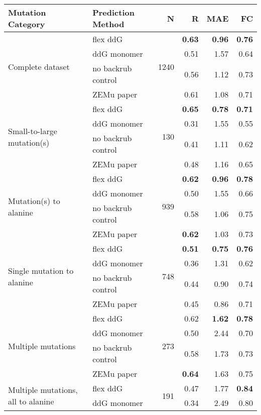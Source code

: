 \begin{table}
  \begin{tabular}{llrrrr}
\toprule
Mutation Category &   Prediction Method &     N &    R &  MAE &   FC \\
\midrule
 \multirow{ 4}{*}{Complete dataset} & flex ddG & \multirow{ 4}{*}{1240} & \textbf{0.63} & \textbf{0.96} & \textbf{0.76}  \\
 & ddG monomer & & 0.51 & 1.57 & 0.64  \\
 & no backrub control & & 0.56 & 1.12 & 0.73  \\
 & ZEMu paper & & 0.61 & 1.08 & 0.71  \\
\hline
 \multirow{ 4}{*}{Small-to-large mutation(s)} & flex ddG & \multirow{ 4}{*}{130} & \textbf{0.65} & \textbf{0.78} & \textbf{0.71}  \\
 & ddG monomer & & 0.31 & 1.55 & 0.55  \\
 & no backrub control & & 0.41 & 1.11 & 0.62  \\
 & ZEMu paper & & 0.48 & 1.16 & 0.65  \\
\hline
 \multirow{ 4}{*}{Mutation(s) to alanine} & flex ddG & \multirow{ 4}{*}{939} & \textbf{0.62} & \textbf{0.96} & \textbf{0.78}  \\
 & ddG monomer & & 0.50 & 1.55 & 0.66  \\
 & no backrub control & & 0.58 & 1.06 & 0.75  \\
 & ZEMu paper & & \textbf{0.62} & 1.03 & 0.73  \\
\hline
 \multirow{ 4}{*}{Single mutation to alanine} & flex ddG & \multirow{ 4}{*}{748} & \textbf{0.51} & \textbf{0.75} & \textbf{0.76}  \\
 & ddG monomer & & 0.36 & 1.31 & 0.62  \\
 & no backrub control & & 0.44 & 0.90 & 0.74  \\
 & ZEMu paper & & 0.45 & 0.86 & 0.71  \\
\hline
 \multirow{ 4}{*}{Multiple mutations} & flex ddG & \multirow{ 4}{*}{273} & 0.62 & \textbf{1.62} & \textbf{0.78}  \\
 & ddG monomer & & 0.50 & 2.44 & 0.70  \\
 & no backrub control & & 0.58 & 1.73 & 0.73  \\
 & ZEMu paper & & \textbf{0.64} & 1.63 & 0.75  \\
\hline
 \multirow{ 4}{*}{Multiple mutations, all to alanine} & flex ddG & \multirow{ 4}{*}{191} & 0.47 & 1.77 & \textbf{0.84}  \\
 & ddG monomer & & 0.34 & 2.49 & 0.80  \\

\end{tabular}
\end{table}
